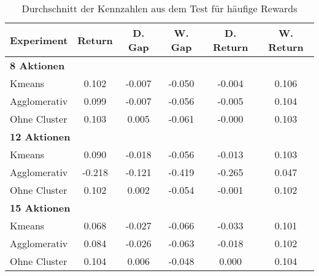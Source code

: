 \begin{table}[ht]
\centering
\caption{Durchschnitt der Kennzahlen aus dem Test für häufige Rewards}
\begin{tabular}{lccccc}
\hline
\textbf{Experiment} & \textbf{Return} & \textbf{D. Gap} & \textbf{W. Gap} & \textbf{D. Return} & \textbf{W. Return} \\
\hline
\multicolumn{6}{l}{\textbf{8 Aktionen}} \\
\hspace{1em}Kmeans & 0.102 & -0.007 & -0.050 & -0.004 & 0.106 \\
\hspace{1em}Agglomerativ & 0.099 & -0.007 & -0.056 & -0.005 & 0.104 \\
\hspace{1em}Ohne Cluster & 0.103 & 0.005 & -0.061 & -0.000 & 0.103 \\
\hline
\multicolumn{6}{l}{\textbf{12 Aktionen}} \\
\hspace{1em}Kmeans & 0.090 & -0.018 & -0.056 & -0.013 & 0.103 \\
\hspace{1em}Agglomerativ & -0.218 & -0.121 & -0.419 & -0.265 & 0.047 \\
\hspace{1em}Ohne Cluster & 0.102 & 0.002 & -0.054 & -0.001 & 0.102 \\
\hline
\multicolumn{6}{l}{\textbf{15 Aktionen}} \\
\hspace{1em}Kmeans & 0.068 & -0.027 & -0.066 & -0.033 & 0.101 \\
\hspace{1em}Agglomerativ & 0.084 & -0.026 & -0.063 & -0.018 & 0.102 \\
\hspace{1em}Ohne Cluster & 0.104 & 0.006 & -0.048 & 0.000 & 0.104 \\
\hline
\end{tabular}
\end{table}


